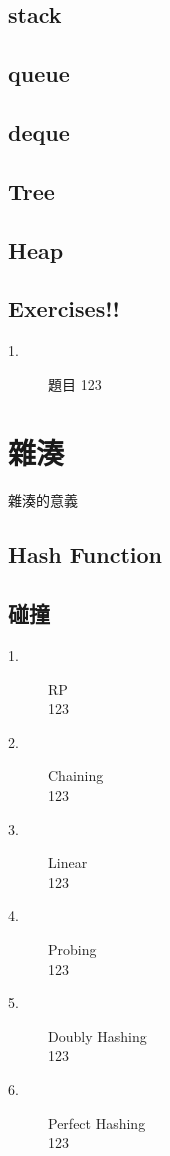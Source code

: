 \documentclass{article}
\begin{document}
\subsection{stack}

\subsection{queue}

\subsection{deque}

\subsection{Tree}

\subsection{Heap}

\subsection{Exercises!!}
\begin{description}
\item[ 1.]題目
123
\end{description}


\section{雜湊}
雜湊的意義

\subsection{Hash Function}

\subsection{碰撞}
\begin{description}
\item[ 1.]RP\\
123
\item[ 2.]Chaining\\
123
\item[ 3.]Linear\\
123
\item[ 4.]Probing\\
123
\item[ 5.]Doubly Hashing\\
123
\item[ 6.]Perfect Hashing\\
123
\end{description}
\end{document}
